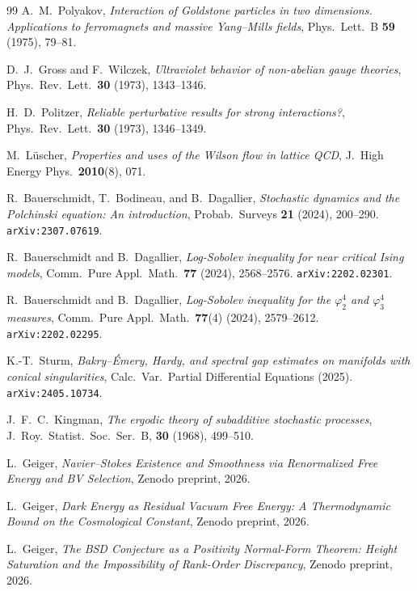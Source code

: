 \documentclass[12pt,a4paper]{article}
\theoremstyle{definition}
\theoremstyle{plain}
\theoremstyle{remark}
\begin{document}
\begin{thebibliography}{99}
A.~M.~Polyakov, \emph{Interaction of Goldstone particles in two dimensions.
Applications to ferromagnets and massive Yang--Mills fields},
Phys.\ Lett.\ B \textbf{59} (1975), 79--81.

D.~J.~Gross and F.~Wilczek, \emph{Ultraviolet behavior of non-abelian gauge theories},
Phys.\ Rev.\ Lett.\ \textbf{30} (1973), 1343--1346.

H.~D.~Politzer, \emph{Reliable perturbative results for strong interactions?},
Phys.\ Rev.\ Lett.\ \textbf{30} (1973), 1346--1349.

M.~L\"uscher, \emph{Properties and uses of the Wilson flow in lattice QCD},
J.\ High Energy Phys.\ \textbf{2010}(8), 071.

R.~Bauerschmidt, T.~Bodineau, and B.~Dagallier, \emph{Stochastic dynamics and the Polchinski equation: An introduction}, Probab.\ Surveys \textbf{21} (2024), 200--290. \texttt{arXiv:2307.07619}.

R.~Bauerschmidt and B.~Dagallier, \emph{Log-Sobolev inequality for near critical Ising models}, Comm.\ Pure Appl.\ Math.\ \textbf{77} (2024), 2568--2576. \texttt{arXiv:2202.02301}.

R.~Bauerschmidt and B.~Dagallier, \emph{Log-Sobolev inequality for the $\varphi^4_2$ and $\varphi^4_3$ measures}, Comm.\ Pure Appl.\ Math.\ \textbf{77}(4) (2024), 2579--2612. \texttt{arXiv:2202.02295}.

K.-T.~Sturm, \emph{Bakry--\'Emery, Hardy, and spectral gap estimates on manifolds with conical singularities}, Calc.\ Var.\ Partial Differential Equations (2025). \texttt{arXiv:2405.10734}.

J.~F.~C.~Kingman, \textit{The ergodic theory of subadditive stochastic processes}, J.~Roy.\ Statist.\ Soc.\ Ser.~B, \textbf{30} (1968), 499--510.

L.~Geiger, \emph{Navier--Stokes Existence and Smoothness via Renormalized Free Energy and BV Selection}, Zenodo preprint, 2026.

L.~Geiger, \emph{Dark Energy as Residual Vacuum Free Energy: A Thermodynamic Bound on the Cosmological Constant}, Zenodo preprint, 2026.

L.~Geiger, \emph{The BSD Conjecture as a Positivity Normal-Form Theorem: Height Saturation and the Impossibility of Rank-Order Discrepancy}, Zenodo preprint, 2026.


\end{thebibliography}
\end{document}
